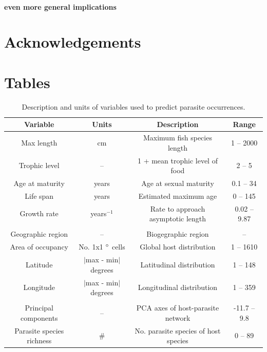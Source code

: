 \documentclass[12pt]{article}
\begin{document}
  
 
 
 
  \paragraph{even more general implications}
 
 
 
 
 
 
 
 
 
\section*{Acknowledgements}










\newpage
\section*{Tables}
  \begin{table}[!h]
  \caption{Description and units of variables used to predict parasite occurrences.}
  \vspace{0.1cm}
  \begin{tabular}{cccc}
\hline
  \textbf{Variable} &   \textbf{Units} &   \textbf{Description} &   \textbf{Range} \\ 
\hline
Max length      & cm           & Maximum fish species length  & 1 -- 2000 \\ 
Trophic level   & --           & 1 + mean trophic level of food  &  2 -- 5\\ 
Age at maturity & years        & Age at sexual maturity  & 0.1 -- 34  \\ 
Life span       & years        & Estimated maximum age & 0 -- 145  \\ 
Growth rate     & years$^{-1}$ & Rate to approach asymptotic length & 0.02 -- 9.87 \\ 
 & & &  \\
Geographic region   & --      &   Biogegraphic region        & -- \\ 
Area of occupancy   & No. 1x1 $\degree$ cells &  Global host distribution  & 1 -- 1610    \\
Latitude            & $\lvert$max - min$\rvert$ degrees & Latitudinal distribution         & 1 -- 148 \\ 
Longitude           & $\lvert$max - min$\rvert$ degrees & Longitudinal distribution        & 1 -- 359 \\ 
 & & &  \\
Principal components      &  -- & PCA axes of host-parasite network   & -11.7 -- 9.8 \\
Parasite species richness & \# & No. parasite species of host species &  0 -- 89 \\
\hline
  \end{tabular}
  \label{tab:traits}
\end{table}
\end{document}
